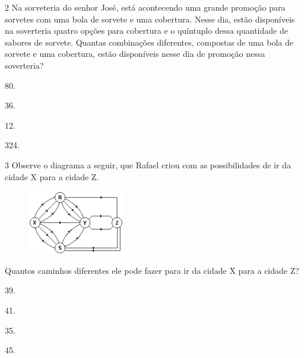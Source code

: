 \num{2} Na sorveteria do senhor José, está acontecendo uma grande promoção para
sorvetes com uma bola de sorvete e uma cobertura. Nesse dia, estão
disponíveis na soverteria quatro opções para cobertura e o quíntuplo dessa
quantidade de sabores de sorvete. Quantas combinações diferentes, compostas de uma bola de
sorvete e uma cobertura, estão disponíveis nesse dia de promoção nessa
soverteria?

\begin{multicols}{2}
\begin{escolha}
\item
  80.
\item
  36.
\item
  12.
\item
  324.
\end{escolha}
\end{multicols}

\num{3} Observe o diagrama a seguir, que Rafael criou com as possibilidades de ir
da cidade X para a cidade Z.

\begin{figure}[htpb!]
\centering
\includegraphics[width=.3\textwidth]{media/image75.png}
\end{figure}

Quantos caminhos diferentes ele pode fazer para ir da cidade X para a
cidade Z?

\begin{multicols}{2}
\begin{escolha}
\item
  39.
\item
  41.
\item
  35.
\item
  45.
\end{escolha}
\end{multicols}

